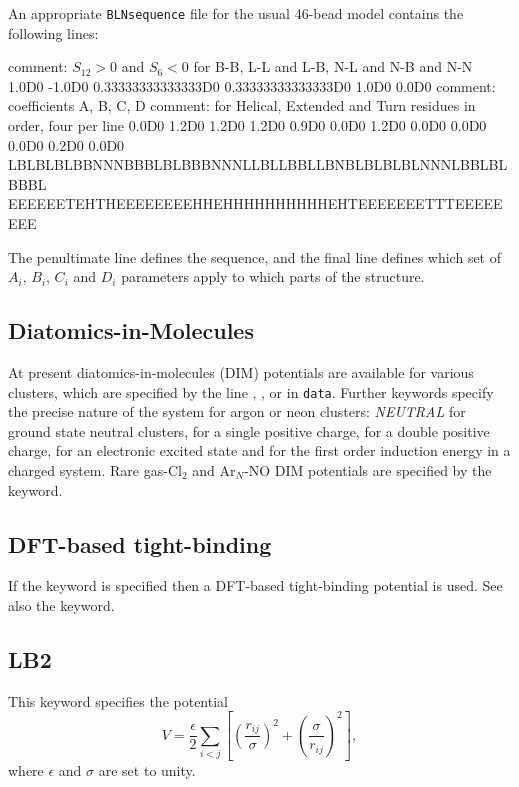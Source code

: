 {An appropriate {\tt BLNsequence} file for the usual 46-bead model contains the following
lines:

{\obeylines
\noindent comment: $S_{12}>0$ and $S_6<0$ for B-B, L-L and L-B, N-L and N-B and N-N
\noindent 1.0D0 -1.0D0
\noindent 0.33333333333333D0 0.33333333333333D0
\noindent 1.0D0 0.0D0
\noindent comment: coefficients A, B, C, D
\noindent comment: for Helical, Extended and Turn residues in order, four per line
\noindent 0.0D0 1.2D0 1.2D0 1.2D0
\noindent 0.9D0 0.0D0 1.2D0 0.0D0
\noindent 0.0D0 0.0D0 0.2D0 0.0D0
\noindent LBLBLBLBBNNNBBBLBLBBBNNNLLBLLBBLLBNBLBLBLBLNNNLBBLBLBBBL
\noindent EEEEEETEHTHEEEEEEEEHHEHHHHHHHHHHEHTEEEEEEETTTEEEEEEEE
}

\noindent The penultimate line defines the sequence, and the final line
defines which set of $A_i$, $B_i$, $C_i$ and $D_i$ parameters apply to which 
parts of the structure.\cite{BrownFH03}


\subsection{Diatomics-in-Molecules}

At present diatomics-in-molecules (DIM) potentials are available for various
clusters, which are specified by the line {\/}, {\/},
{} or {\/} in {\tt data}.
Further keywords specify the precise nature of the system for argon or
neon clusters: {\it NEUTRAL\/} for ground state neutral
clusters, {\/} for a single positive charge, {\/} for a double positive
charge, {\/} for an electronic excited state and {\/} for the first order
induction energy in a charged system. Rare gas-Cl$_2$ and Ar$_N$-NO DIM potentials
are specified by the {\/} keyword.

\subsection{DFT-based tight-binding}

If the {\/} keyword is specified then a DFT-based tight-binding potential
is used. See also the {\/} keyword.

\subsection{LB2}

This keyword specifies the potential\cite{LB299a,LB299b,LB204}
\begin{equation}
V = \frac{\epsilon}{2} \sum_{i<j} \left[ \left(\frac{r_{ij}}{\sigma}\right)^2+
\left(\frac{\sigma}{r_{ij}}\right)^2\right],
\end{equation}
where $\epsilon$ and $\sigma$ are set to unity.

}
